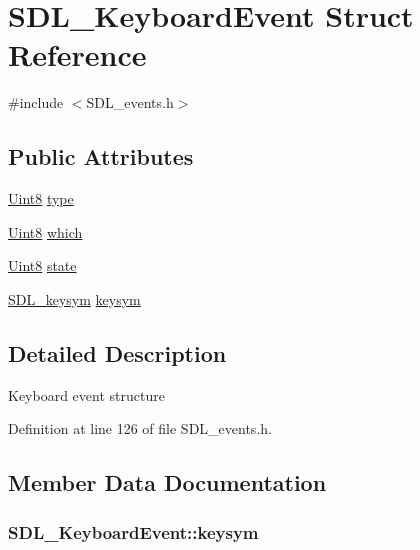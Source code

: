 \hypertarget{struct_s_d_l___keyboard_event}{}\section{S\+D\+L\+\_\+\+Keyboard\+Event Struct Reference}
\label{struct_s_d_l___keyboard_event}


{\ttfamily \#include $<$S\+D\+L\+\_\+events.\+h$>$}

\subsection*{Public Attributes}
\begin{DoxyCompactItemize}
\item 
\hyperlink{_s_d_l__stdinc_8h_a2944638813a090aa23e62f4da842c3e2}{Uint8} \hyperlink{struct_s_d_l___keyboard_event_a325194806bc8a4a259fc6c610d487293}{type}
\item 
\hyperlink{_s_d_l__stdinc_8h_a2944638813a090aa23e62f4da842c3e2}{Uint8} \hyperlink{struct_s_d_l___keyboard_event_acb25972bab6a9f142de5652530857b9b}{which}
\item 
\hyperlink{_s_d_l__stdinc_8h_a2944638813a090aa23e62f4da842c3e2}{Uint8} \hyperlink{struct_s_d_l___keyboard_event_a110558eb96c113c86cfa31a7018c2346}{state}
\item 
\hyperlink{struct_s_d_l__keysym}{S\+D\+L\+\_\+keysym} \hyperlink{struct_s_d_l___keyboard_event_aff2459de9aae91c753611b8947af8fc1}{keysym}
\end{DoxyCompactItemize}


\subsection{Detailed Description}
Keyboard event structure 

Definition at line 126 of file S\+D\+L\+\_\+events.\+h.



\subsection{Member Data Documentation}
\hypertarget{struct_s_d_l___keyboard_event_aff2459de9aae91c753611b8947af8fc1}{}
\subsubsection[{keysym}]{ S\+D\+L\+\_\+\+Keyboard\+Event\+::keysym}\label{struct_s_d_l___keyboard_event_aff2459de9aae91c753611b8947af8fc1}


